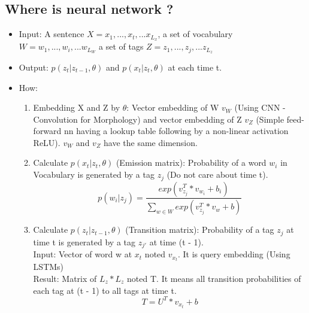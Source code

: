 \documentclass{article}
\begin{document}
\subsection{Where is neural network ?}
\begin{itemize}
\item Input: A sentence $X = x_{1},..., x_{t},... x_{L_{x}}$, a set of vocabulary $W = w_{1},..., w_{i},... w_{L_{W}}$ a set of tags $Z = z_{1},..., z_{j},... z_{L_{z}}$
\item Output: $p(z_{t}|z_{t-1},\theta)$ and $p(x_{t}|z_{t},\theta)$ at each time t.

\item How:
	\begin{enumerate}
	\item Embedding X and Z by $\theta$: Vector embedding of W $v_{W}$ (Using CNN - Convolution for Morphology) and vector embedding of Z $v_{Z}$ (Simple feed-forward nn having a lookup table following by a non-linear activation ReLU). $v_{W}$ and $v_{Z}$ have the same dimension.
	\item Calculate $p(x_{t}|z_{t},\theta)$ (Emission matrix): Probability of a word $w_{i}$ in Vocabulary is generated by a tag $z_{j}$ (Do not care about time t).
	\begin{equation}
	p(w_{i}|z_{j}) = \frac{exp(v_{z_{j}}^{T}*v_{w_{i}} + b_{i})}{\sum_{w \in W} exp(v_{z_{j}}^{T}*v_{w} + b)}
	\end{equation}

	\item Calculate $p(z_{t}|z_{t-1},\theta)$ (Transition matrix): Probability of a tag $z_{j}$ at time t is generated by a tag $z_{j'}$ at time (t - 1).\\
	Input: Vector of word w at $x_{t}$ noted $v_{x_{t}}$. It is query embedding (Using LSTMs) \\
	Result: Matrix of $L_{z}*L_{z}$ noted T. It means all transition probabilities of each tag at (t - 1) to all tags at time t.\\
	\begin{equation}
	T = U^{T}*v_{x_{t}} + b
	\end{equation}
	\end{enumerate}
\end{itemize}

\end{document}
